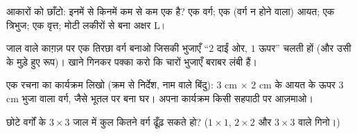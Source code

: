 \begin{exercise}[$\star$]\label{exo:g3:shapes:8}
आकारों को छाँटो: इनमें से किनमें कम से कम एक  है?
एक वर्ग; एक (वर्ग न होने वाला) आयत; एक  त्रिभुज; एक वृत्त;
मोटी लकीरों से बना अक्षर L।
\end{exercise}

\begin{exercise}[$\star\star$]\label{exo:g3:shapes:9}
जाल वाले काग़ज़ पर एक तिरछा वर्ग बनाओ जिसकी भुजाएँ ``$2$ दाईं
ओर, $1$ ऊपर'' चलती हों (और उसी के मुड़े हुए रूप)। खाने गिनकर
पक्का करो कि चारों भुजाएँ बराबर लंबी हैं।
\end{exercise}

\begin{exercise}[$\star\star$]\label{exo:g3:shapes:10}
एक रचना का कार्यक्रम लिखो (क्रम से निर्देश, नाम वाले बिंदु):
$3$ cm $\times$ $2$ cm के आयत के ऊपर $3$ cm भुजा वाला वर्ग,
जैसे भूतल पर बना घर। अपना कार्यक्रम किसी सहपाठी पर
आज़माओ।
\end{exercise}

\begin{exercise}[$\star\star$]\label{exo:g3:shapes:11}
छोटे वर्गों के $3 \times 3$ जाल में कुल कितने वर्ग ढूँढ़ सकते
हो? ($1 \times 1$, $2 \times 2$ और $3 \times 3$ वाले
गिनो।)
\end{exercise}

